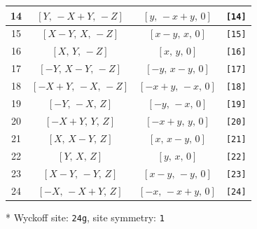 \documentclass[fleqn,8pt]{jsarticle}
\begin{document}
\begin{longtable}{cccc}
14 & $\left[ Y,\, - X + Y,\, - Z \right]$ & $\left[ y,\, - x + y,\, 0 \right]$ & {\tt [14]} \\ \hline
15 & $\left[ X - Y,\, X,\, - Z \right]$ & $\left[ x - y,\, x,\, 0 \right]$ & {\tt [15]} \\ \hline
16 & $\left[ X,\, Y,\, - Z \right]$ & $\left[ x,\, y,\, 0 \right]$ & {\tt [16]} \\ \hline
17 & $\left[ - Y,\, X - Y,\, - Z \right]$ & $\left[ - y,\, x - y,\, 0 \right]$ & {\tt [17]} \\ \hline
18 & $\left[ - X + Y,\, - X,\, - Z \right]$ & $\left[ - x + y,\, - x,\, 0 \right]$ & {\tt [18]} \\ \hline
19 & $\left[ - Y,\, - X,\, Z \right]$ & $\left[ - y,\, - x,\, 0 \right]$ & {\tt [19]} \\ \hline
20 & $\left[ - X + Y,\, Y,\, Z \right]$ & $\left[ - x + y,\, y,\, 0 \right]$ & {\tt [20]} \\ \hline
21 & $\left[ X,\, X - Y,\, Z \right]$ & $\left[ x,\, x - y,\, 0 \right]$ & {\tt [21]} \\ \hline
22 & $\left[ Y,\, X,\, Z \right]$ & $\left[ y,\, x,\, 0 \right]$ & {\tt [22]} \\ \hline
23 & $\left[ X - Y,\, - Y,\, Z \right]$ & $\left[ x - y,\, - y,\, 0 \right]$ & {\tt [23]} \\ \hline
24 & $\left[ - X,\, - X + Y,\, Z \right]$ & $\left[ - x,\, - x + y,\, 0 \right]$ & {\tt [24]} \\
\end{longtable}
* Wyckoff site: {\tt 24g}, site symmetry: {\tt 1}
\renewcommand{\arraystretch}{1.2}
\end{document}
